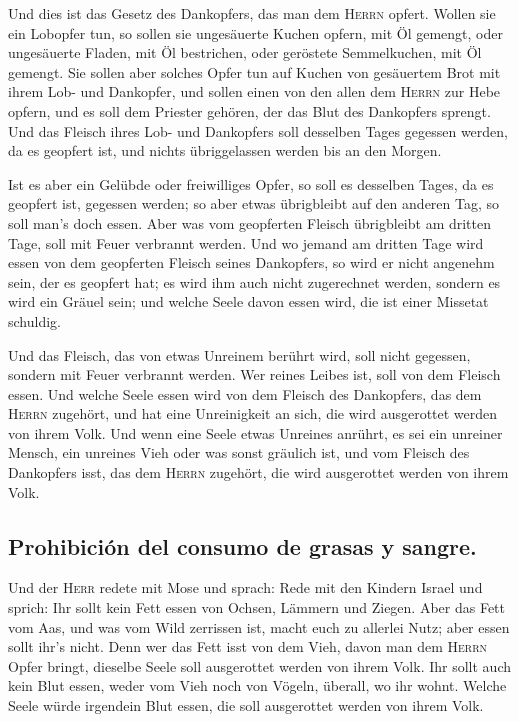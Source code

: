  Und dies ist das Gesetz des Dankopfers, das man dem
\textsc{Herrn} opfert.  Wollen sie ein Lobopfer tun, so
sollen sie ungesäuerte Kuchen opfern, mit Öl gemengt, oder ungesäuerte
Fladen, mit Öl bestrichen, oder geröstete Semmelkuchen, mit Öl gemengt.
 Sie sollen aber solches Opfer tun auf Kuchen von
gesäuertem Brot mit ihrem Lob- und Dankopfer,  und sollen
einen von den allen dem \textsc{Herrn} zur Hebe opfern, und es soll dem
Priester gehören, der das Blut des Dankopfers sprengt. 
Und das Fleisch ihres Lob- und Dankopfers soll desselben Tages gegessen
werden, da es geopfert ist, und nichts übriggelassen werden bis an den
Morgen.

 Ist es aber ein Gelübde oder freiwilliges Opfer, so soll
es desselben Tages, da es geopfert ist, gegessen werden; so aber etwas
übrigbleibt auf den anderen Tag, so soll man's doch essen.
 Aber was vom geopferten Fleisch übrigbleibt am dritten
Tage, soll mit Feuer verbrannt werden.  Und wo jemand am
dritten Tage wird essen von dem geopferten Fleisch seines Dankopfers, so
wird er nicht angenehm sein, der es geopfert hat; es wird ihm auch nicht
zugerechnet werden, sondern es wird ein Gräuel sein; und welche Seele
davon essen wird, die ist einer Missetat schuldig.

 Und das Fleisch, das von etwas Unreinem berührt wird,
soll nicht gegessen, sondern mit Feuer verbrannt werden. Wer reines
Leibes ist, soll von dem Fleisch essen.  Und welche Seele
essen wird von dem Fleisch des Dankopfers, das dem \textsc{Herrn}
zugehört, und hat eine Unreinigkeit an sich, die wird ausgerottet werden
von ihrem Volk.  Und wenn eine Seele etwas Unreines
anrührt, es sei ein unreiner Mensch, ein unreines Vieh oder was sonst
gräulich ist, und vom Fleisch des Dankopfers isst, das dem
\textsc{Herrn} zugehört, die wird ausgerottet werden von ihrem Volk.

\hypertarget{prohibiciuxf3n-del-consumo-de-grasas-y-sangre.}{%
\subsection{Prohibición del consumo de grasas y
sangre.}\label{prohibiciuxf3n-del-consumo-de-grasas-y-sangre.}}

 Und der \textsc{Herr} redete mit Mose und sprach:
 Rede mit den Kindern Israel und sprich: Ihr sollt kein
Fett essen von Ochsen, Lämmern und Ziegen.  Aber das Fett
vom Aas, und was vom Wild zerrissen ist, macht euch zu allerlei Nutz;
aber essen sollt ihr's nicht.  Denn wer das Fett isst von
dem Vieh, davon man dem \textsc{Herrn} Opfer bringt, dieselbe Seele soll
ausgerottet werden von ihrem Volk.  Ihr sollt auch kein
Blut essen, weder vom Vieh noch von Vögeln, überall, wo ihr wohnt.
 Welche Seele würde irgendein Blut essen, die soll
ausgerottet werden von ihrem Volk.

